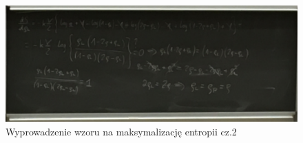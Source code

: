 \documentclass[12pt,a4paper]{report}
\begin{document}
\begin{figure}[!ht]
    \centering
    \includegraphics[width=\linewidth]{Wyk_5_Rys_3.JPG}
    \caption{Wyprowadzenie wzoru na maksymalizację entropii cz.2}
    \label{fig:lec_5:app:maksymalizacja_entropii_2}
\end{figure}
\end{document}
